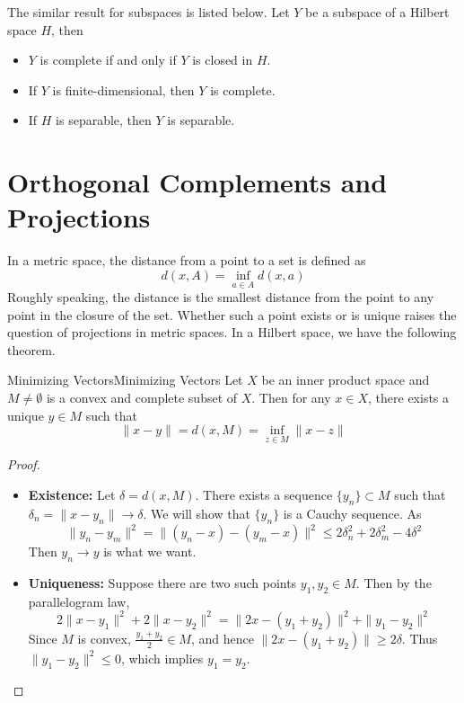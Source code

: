 \documentclass[../main.tex]{subfiles}
\begin{document}
The similar result for subspaces is listed below. Let $Y$ be a subspace of a Hilbert space $H$, then
\begin{itemize}
	\item $Y$ is complete if and only if $Y$ is closed in $H$.
	\item If $Y$ is finite-dimensional, then $Y$ is complete.
	\item If $H$ is separable, then $Y$ is separable.
\end{itemize}

\section{Orthogonal Complements and Projections}

In a metric space, the distance from a point to a set is defined as
\begin{equation}
	d(x, A) = \inf_{a \in A} d(x, a)
\end{equation}
Roughly speaking, the distance is the smallest distance from the point to any point in the closure of the set. Whether such a point exists or is unique raises the question of projections in metric spaces. In a Hilbert space, we have the following theorem.

\begin{theorem}{Minimizing Vectors}{Minimizing Vectors}
	Let $X$ be an inner product space and $M\neq \emptyset $ is a convex and complete subset of $X$. Then for any $x\in X$, there exists a unique $y\in M$ such that
	\begin{equation}
		\|x-y\| = d(x,M) = \inf_{z\in M} \|x-z\|
	\end{equation}
\end{theorem}
\begin{proof}
	\begin{itemize}
		\item \textbf{Existence:} Let $\delta = d(x,M)$. There exists a sequence $\{y_n\} \subset M$ such that $\delta_n = \|x - y_n\| \to \delta$. We will show that $\{y_n\}$ is a Cauchy sequence. As
			\begin{equation*}
				\|y_n - y_m\|^2 = \|(y_n - x) - (y_m - x)\|^2 \leq 2\delta_n^2 + 2\delta_m^2 - 4 \delta^2
			\end{equation*}
			Then $y_n \rightarrow y$ is what we want.
		\item \textbf{Uniqueness:} Suppose there are two such points $y_1, y_2 \in M$. Then by the parallelogram law,
			\begin{equation*}
				2\|x - y_1\|^2 + 2\|x - y_2\|^2 = \|2x - (y_1 + y_2)\|^2 + \|y_1 - y_2\|^2
			\end{equation*}
			Since $M$ is convex, $\frac{y_1 + y_2}{2} \in M$, and hence $\|2x - (y_1 + y_2)\| \geq 2\delta$. Thus $\|y_1 - y_2\|^2 \leq 0$, which implies $y_1 = y_2$.
	\end{itemize}
\end{proof}
\end{document}
